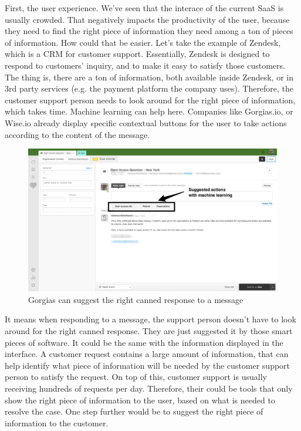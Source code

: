 \documentclass[12pt]{article}
\begin{document}
First, the user experience. We've seen that the interace of the current SaaS is
usually crowded. That negatively impacts the productivity of the user, because
they need to find the right piece of information they need among a ton of pieces
of information. How could that be easier. Let's take the example of Zendesk,
which is a CRM for customer support. Essentially, Zendesk is designed to respond
to customers' inquiry, and to make it easy to satisfy those customers. The thing
is, there are a ton of information, both available inside Zendesk, or in 3rd
party services (e.g. the payment platform the company uses). Therefore, the
customer support person needs to look around for the right piece of information,
which takes time. Machine learning can help here. Companies like Gorgias.io, or
Wise.io already display specific contextual buttons for the user to take actions
according to the content of the message.

\smallskip

\begin{figure}[h]
    \centering
    \includegraphics[width=\textwidth]{zendesk}
    \caption{Gorgias can suggest the right canned response to a message}
    \label{fig:gorgias}
\end{figure}


\smallskip

It means when responding to a message, the support person doesn't have to look
around for the right canned response. They are just suggested it by those smart
pieces of software. It could be the same with the information displayed in the
interface. A customer request contains a large amount of information, that can
help identify what piece of information will be needed by the customer support
person to satisfy the request. On top of this, customer support is usually
receiving hundreds of requests per day. Therefore, their could be tools that
only show the right piece of information to the user, based on what is needed to
resolve the case. One step further would be to suggest the right piece of
information to the customer.
\end{document}
